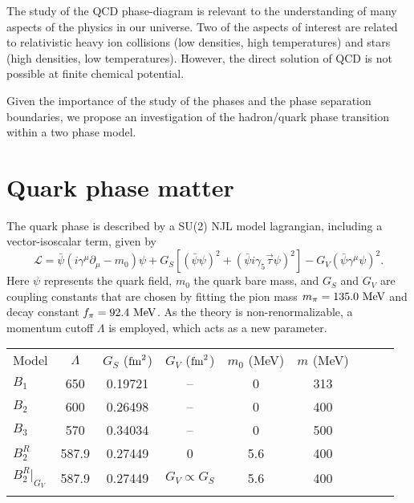 \documentclass{ws-ijmpcs}
\begin{document}
The study of the QCD phase-diagram is relevant to the understanding of many aspects of the physics in our universe. Two of the aspects of interest are related to relativistic heavy ion collisions (low densities, high temperatures) and stars (high densities, low temperatures). However, the direct solution of QCD is not possible at finite chemical potential.

Given the importance of the study of the phases and the phase separation boundaries, we propose an investigation of the hadron/quark phase transition within a two phase model.

\section{Quark phase matter}

The quark phase is described by a SU(2) NJL model lagrangian, including a vector-isoscalar term, given by \cite{Buballa2005}
\begin{equation}\label{Eq:LagNJL-SU2-Bub}
	\mathcal{L} =\bar{\psi}(i\gamma^\mu\partial_\mu - m_0)\psi + G_S[(\bar{\psi}\psi)^2 + (\bar{\psi}i\gamma_5\vec{\tau}\psi)^2] - G_V(\bar{\psi}\gamma^\mu \psi)^2.
\end{equation}
%
Here $\psi$ represents the quark field, $m_0$ the quark bare mass, and $G_S$ and $G_V$ are coupling constants that are chosen by fitting the pion mass $m_\pi = 135.0~\rm{MeV}$ and decay constant $f_\pi = 92.4~\rm{MeV}$. As the theory is non-renormalizable, a momentum cutoff $\Lambda$ is employed, which acts as a new parameter.

\begin{table}[ph]
{\begin{tabular}{@{}lcccccccc@{}}\toprule
Model &  $\Lambda$ & $G_S$ ($\rm{fm}^2$) & $G_V$ ($\rm{fm}^2$) & $m_0$ (MeV) & $m$ (MeV) \\ \colrule
$B_1$ & 650 & 0.19721 & -- & 0 & 313 \\
$B_2$ & 600 & 0.26498 & -- & 0 & 400 \\
$B_3$ & 570 & 0.34034 & -- & 0 & 500 \\
$B_2^R$ & 587.9 & 0.27449 & 0 & 5.6 & 400 \\
$B_2^R|_{G_V}$ & 587.9 & 0.27449 & $G_V \propto G_S$ & 5.6 & 400\\
\botrule
\end{tabular} \label{Tab:Parametros_NJL}}
\end{table}
\end{document}
